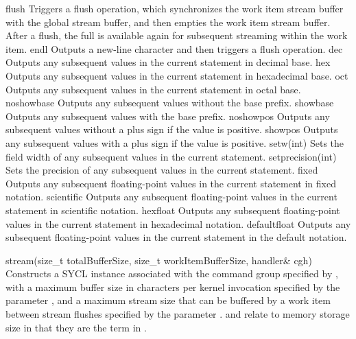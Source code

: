 \addRow
{
  flush
}
{
  Triggers a flush operation, which synchronizes the work item stream buffer with the global
  stream buffer, and then empties the work item stream buffer.  After a flush, the full
   is available again for subsequent streaming within the work item.
}
\addRow
{
  endl
}
{
  Outputs a new-line character and then triggers a flush operation.
}
\addRow
{
  dec
}
{
  Outputs any subsequent values in the current statement in decimal base.
}
\addRow
{
  hex
}
{
  Outputs any subsequent values in the current statement in hexadecimal base.
}
\addRow
{
  oct
}
{
  Outputs any subsequent values in the current statement in octal base.
}
\addRow
{
  noshowbase
}
{
  Outputs any subsequent values without the base prefix.
}
\addRow
{
  showbase
}
{
  Outputs any subsequent values with the base prefix.
}
\addRow
{
  noshowpos
}
{
  Outputs any subsequent values without a plus sign if the value is positive.
}
\addRow
{
  showpos
}
{
  Outputs any subsequent values with a plus sign if the value is positive.
}
\addRow
{
  setw(int)
}
{
  Sets the field width of any subsequent values in the current statement.
}
\addRow
{
  setprecision(int)
}
{
  Sets the precision of any subsequent values in the current statement.
}
\addRow
{
  fixed
}
{
  Outputs any subsequent floating-point values in the current statement in fixed notation.
}
\addRow
{
  scientific
}
{
  Outputs any subsequent floating-point values in the current statement in scientific notation.
}
\addRow
{
  hexfloat
}
{
  Outputs any subsequent floating-point values in the current statement in hexadecimal notation.
}
\addRow
{
  defaultfloat
}
{
  Outputs any subsequent floating-point values in the current statement in the default notation.
}
\completeTable

  \addRow
    {stream(size_t totalBufferSize, size_t workItemBufferSize, handler\& cgh)}
    {
      Constructs a SYCL  instance associated with the command group specified by , with a maximum buffer size in characters per kernel invocation specified by the parameter , and a maximum stream size that can be buffered by a work item between stream flushes specified by the parameter .   and  relate to memory storage size in that they are the term  in .
    }
\completeTable


